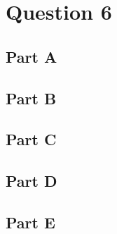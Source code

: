 \documentclass[letterpaper]{article}
\begin{document}
\newpage

\section*{Question 6}

\subsection*{Part A}

\subsection*{Part B}

\subsection*{Part C}

\subsection*{Part D}

\subsection*{Part E}
\end{document}
